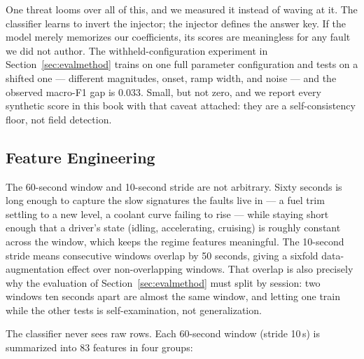 One threat looms over all of this, and we measured it instead of waving at
it. The classifier learns to invert the injector; the injector defines the
answer key. If the model merely memorizes our coefficients, its scores are
meaningless for any fault we did not author. The withheld-configuration
experiment in Section~\ref{sec:evalmethod} trains on one full parameter
configuration and tests on a shifted one --- different magnitudes, onset,
ramp width, and noise --- and the observed macro-F1 gap is 0.033. Small,
but not zero, and we report every synthetic score in this book with that
caveat attached: they are a self-consistency floor, not field detection.

\subsection{Feature Engineering}
\label{sec:features}

The 60-second window and 10-second stride are not arbitrary. Sixty seconds
is long enough to capture the slow signatures the faults live in --- a fuel
trim settling to a new level, a coolant curve failing to rise --- while
staying short enough that a driver's state (idling, accelerating, cruising)
is roughly constant across the window, which keeps the regime features
meaningful. The 10-second stride means consecutive windows overlap by 50
seconds, giving a sixfold data-augmentation effect over non-overlapping
windows. That overlap is also precisely why the evaluation of
Section~\ref{sec:evalmethod} must split by session: two windows ten seconds
apart are almost the same window, and letting one train while the other
tests is self-examination, not generalization.

The classifier never sees raw rows. Each 60-second window (stride 10\,s)
is summarized into 83 features in four groups:


